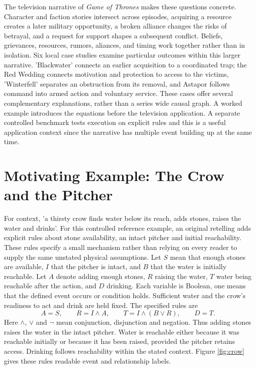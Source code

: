 \documentclass{svproc}
\begin{document}
The television narrative of \emph{Game of Thrones} makes these questions concrete. Character and faction stories intersect across episodes, acquiring a resource creates a later military opportunity, a broken alliance changes the risks of betrayal, and a request for support shapes a subsequent conflict. Beliefs, grievances, resources, rumors, aliances, and timing work together rather than in isolation. Six local case studies examine particular outcomes within this larger narrative. 'Blackwater' connects an earlier acquisition to a coordinated trap; the Red Wedding connects motivation and protection to access to the victims, 'Winterfell' separates an obstruction from its removal, and Astapor follows command into armed action and voluntary service. These cases offer several complementary explanations, rather than a series wide causal graph.
A worked example introduces the equations before the television application. A separate controlled benchmark tests execution on explicit rules and this is a useful application context since the narrative has multiple event building up at the same time.




\section{Motivating Example: The Crow and the Pitcher}\label{sec:crow}
For context, 'a thirsty crow finds water below its reach, adds stones, raises the water and drinks'. For this controlled reference example, an original retelling adds explicit rules about stone availability, an intact pitcher and initial reachability. These rules specify a small mechanism rather than relying on every reader to supply the same unstated physical assumptions.
Let $S$ mean that enough stones are available, $I$ that the pitcher is intact, and $B$ that the water is initially reachable. Let $A$ denote adding enough stones, $R$ raising the water, $T$ water being reachable after the action, and $D$ drinking. Each variable is Boolean, one means that the defined event occurs or condition holds. Sufficient water and the crow's readiness to act and drink are held fixed. The specified rules are
\begin{equation}\label{eq:crow}
 A=S,\qquad R=I\land A,\qquad
 T=I\land(B\lor R),\qquad D=T.
\end{equation}
Here $\land$, $\lor$ and $\neg$ mean conjunction, disjunction and negation. Thus adding stones raises the water in the intact pitcher. Water is reachable either because it was reachable initially or because it has been raised, provided the pitcher retains access. Drinking follows reachability within the stated context. Figure \ref{fig:crow} gives these rules readable event and relationship labels.
\end{document}
